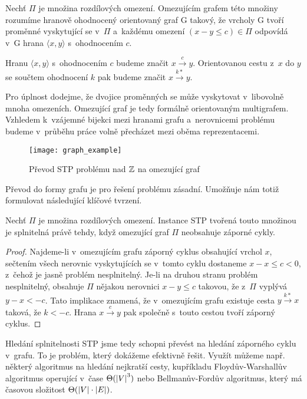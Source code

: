 \begin{definice}
	Nechť $\Pi$ je množina rozdílových omezení. Omezujícím grafem této množiny rozumíme hranově ohodnocený orientovaný graf G takový, že vrcholy G tvoří proměnné vyskytující se v~$\Pi$ a~každému omezení $(x-y \leq c) \in \Pi$ odpovídá v~G hrana $\langle x,y\rangle$ s~ohodnocením $c$.
\end{definice}
\begin{pozn}
	Hranu $\langle x,y\rangle$ s~ohodnocením $c$ budeme značit $x \xrightarrow{c} y$. Orientovanou cestu z~$x$ do $y$ se součtem ohodnocení $k$ pak budeme značit $x \xrightarrow{k*} y$.
\end{pozn}

Pro úplnost dodejme, že dvojice proměnných se může vyskytovat v~libovolně mnoha omezeních. Omezující graf je tedy formálně orientovaným multigrafem. Vzhledem k~vzájemné bijekci mezi hranami grafu a~nerovnicemi problému budeme v~průběhu práce volně přecházet mezi oběma reprezentacemi.

\begin{figure}
	\centering
	\texttt{[image: graph\_example]}
	\caption{Převod STP problému nad $\mathbb{Z}$ na omezující graf}
\end{figure}

Převod do formy grafu je pro řešení problému zásadní. Umožňuje nám totiž formulovat následující klíčové tvrzení.

\begin{tvrz}
	Nechť $\Pi$ je množina rozdílových omezení. Instance STP tvořená touto množinou je splnitelná právě tehdy, když omezující graf $\Pi$ neobsahuje záporné cykly.
\end{tvrz}
\begin{proof}
	Najdeme-li v~omezujícím grafu záporný cyklus obsahující vrchol $x$, sečtením všech nerovnic vyskytujících se v~tomto cyklu dostaneme $x-x \leq c < 0$, z~čehož je jasně problém nesplnitelný. Je-li na druhou stranu problém nesplnitelný, obsahuje $\Pi$ nějakou nerovnici $x - y \leq c$ takovou, že z~$\Pi$ vyplývá $y - x < -c$. Tato implikace znamená, že v~omezujícím grafu existuje cesta $y \xrightarrow{k*} x$ taková, že $k < -c$. Hrana $x \xrightarrow{c} y$ pak společně s~touto cestou tvoří záporný cyklus.
\end{proof}

Hledání splnitelnosti STP jsme tedy schopni převést na hledání záporného cyklu v~grafu. To je problém, který dokážeme efektivně řešit. Využít můžeme např. některý algoritmus na hledání nejkratší cesty, kupříkladu Floydův-Warshallův algoritmus operující v~čase $\Theta(\left|{V}\right|^3)$ nebo Bellmanův-Fordův algoritmus, který má časovou složitost $\Theta(\left|{V}\right|\cdot\left|{E}\right|)$.

